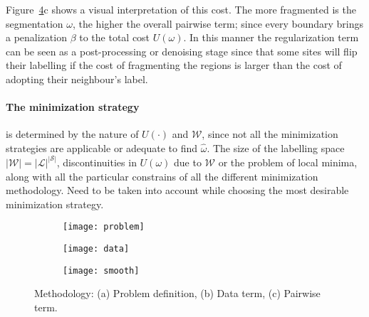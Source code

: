 Figure~\ref{fig:methodTerms}c shows a visual interpretation of this cost.
The more fragmented is the segmentation $\omega$, the higher the overall pairwise term; since every boundary brings a penalization $\beta$ to the total cost $U(\omega)$.
In this manner the regularization term can be seen as a post-processing or denoising stage since that some sites will flip their labelling if the cost of fragmenting the regions is larger than the cost of adopting their neighbour's label. 


\paragraph{The minimization strategy} \label{sec:method:min}
is determined by the nature of $U(\cdot)$ and $\mathcal{W}$, since not all the minimization strategies are applicable or adequate to find $\hat{\omega}$.
The size of the labelling space $|\mathcal{W}|=|\mathcal{L}|^{|\mathcal{S}|}$, discontinuities in $U(\omega)$ due to $\mathcal{W}$ or the problem of local minima, 
along with all the particular constrains of all the different minimization methodology.
Need to be taken into account while choosing the most desirable minimization strategy.

\begin{figure}[t]
    \centering
    \begin{subfigure}[b]{0.19\textwidth}
        \centering
        \texttt{[image: problem]}
        \label{fig:methodTerms:problem}
    \end{subfigure}
    \hfill
    \begin{subfigure}[b]{0.39\textwidth}  
        \centering 
        \texttt{[image: data]}
        \label{fig:methodTerms:data}
    \end{subfigure}
    \hfill
    \begin{subfigure}[b]{0.39\textwidth}   
        \centering 
        \texttt{[image: smooth]} 
        \label{fig:methodTerms:boundary}
    \end{subfigure}
    \caption {\small Methodology: (a) Problem definition, (b) Data term, (c) Pairwise term.} 
    \label{fig:methodTerms}
\end{figure}

